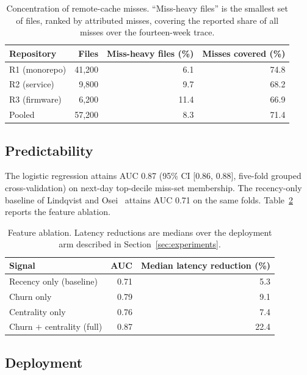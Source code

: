 \documentclass{anvil-paper}
\begin{document}
\begin{table}[t]
  \centering
  \begin{tabular}{lrrr}
    \toprule
    Repository & Files & Miss-heavy files (\%) & Misses covered (\%) \\
    \midrule
    R1 (monorepo)  & 41{,}200 & 6.1 & 74.8 \\
    R2 (service)   & 9{,}800  & 9.7 & 68.2 \\
    R3 (firmware)  & 6{,}200  & 11.4 & 66.9 \\
    \midrule
    Pooled         & 57{,}200 & 8.3 & 71.4 \\
    \bottomrule
  \end{tabular}
  \caption{Concentration of remote-cache misses. ``Miss-heavy files'' is the
  smallest set of files, ranked by attributed misses, covering the reported
  share of all misses over the fourteen-week trace.}
  \label{tab:concentration}
\end{table}

\subsection{Predictability}

The logistic regression attains AUC 0.87 (95\% CI [0.86, 0.88], five-fold
grouped cross-validation) on next-day top-decile miss-set membership. The
recency-only baseline of Lindqvist and Osei~\cite{lindqvist2021prefetch}
attains AUC 0.71 on the same folds. Table~\ref{tab:ablation} reports the
feature ablation.

\begin{table}[t]
  \centering
  \begin{tabular}{lrr}
    \toprule
    Signal & AUC & Median latency reduction (\%) \\
    \midrule
    Recency only (baseline)      & 0.71 & 5.3 \\
    Churn only                   & 0.79 & 9.1 \\
    Centrality only              & 0.76 & 7.4 \\
    Churn $+$ centrality (full)  & 0.87 & 22.4 \\
    \bottomrule
  \end{tabular}
  \caption{Feature ablation. Latency reductions are medians over the
  deployment arm described in Section~\ref{sec:experiments}.}
  \label{tab:ablation}
\end{table}

\subsection{Deployment}
\end{document}
